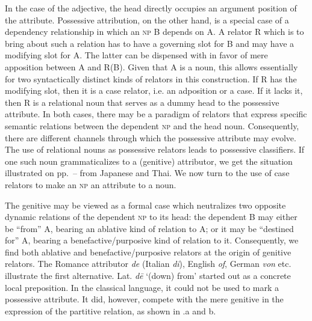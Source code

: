 In the case of the adjective, the head directly occupies an argument position of the attribute. Possessive attribution, on the other hand, is a special case of a dependency relationship in which an \textsc{np} B depends on A.\label{page78} A relator R which is to bring about such a relation has to have a governing slot for B and may have a modifying slot for A. The latter can be dispensed with in favor of mere apposition between A and R(B). Given that A is a noun, this allows essentially for two syntactically distinct kinds of relators in this construction. If R has the modifying slot, then it is a case relator, i.e. an adposition or a case. If it lacks it, then R is a relational noun that serves as a dummy head to the possessive attribute. In both cases, there may be a paradigm of relators that express specific semantic relations between the dependent \textsc{np} and the head noun. Consequently, there are different channels through which the possessive attribute may evolve. The use of relational nouns as possessive relators leads to possessive classifiers. If one such noun grammaticalizes to a (genitive) attributor, we get the situation illustrated on pp.~\pageref{page74b}--\pageref{page75}\chk%
  from Japanese and Thai. We now turn to the use of case relators to make an \textsc{np} an attribute to a noun.

The genitive may be viewed as a formal case which neutralizes two opposite dynamic relations of the dependent \textsc{np} to its head: the dependent B may either be “from” A, bearing an ablative kind of relation to A; or it may be “destined for” A, bearing a benefactive/purposive kind of relation to it. Consequently, we find both ablative and benefactive/purposive relators at the origin of genitive relators.\label{page78b} The Romance attributor \textit{de} (Italian \textit{di}), English \textit{of}, German \textit{von} etc. illustrate the first alternative. Lat. \textit{d\=e} ‘(down) from’ started out as a concrete local preposition. In the classical language, it could not be used to mark a possessive attribute. It did, however, compete with the mere genitive in the expression of the partitive relation, as shown in .a and b.

